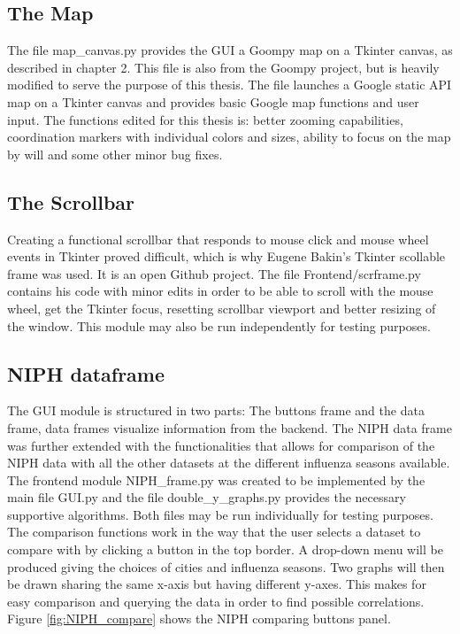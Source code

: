 \subsection{The Map}
The file map\_canvas.py provides the GUI a Goompy\cite{goompy} map on a Tkinter canvas, as described in chapter 2. This file is also from the Goompy project, but is heavily modified to serve the purpose of this thesis. The file launches a Google static API map on a Tkinter canvas and provides basic Google map functions and user input. The functions edited for this thesis is: better zooming capabilities, coordination markers with individual colors and sizes, ability to focus on the map by will and some other minor bug fixes.






\subsection{The Scrollbar}
Creating a functional scrollbar that responds to mouse click and mouse wheel events in Tkinter proved difficult, which is why Eugene Bakin's Tkinter scollable\cite{scrframe} frame was used. It is an open Github project. The file Frontend/scrframe.py contains his code with minor edits in order to be able to scroll with the mouse wheel, get the Tkinter focus, resetting scrollbar viewport and better resizing of the window. This module may also be run independently for testing purposes.




\subsection{NIPH dataframe}
The GUI module is structured in two parts: The buttons frame and the data frame, data frames visualize information from the backend. The NIPH data frame was further extended with the functionalities that allows for comparison of the NIPH data with all the other datasets at the different influenza seasons available. The frontend module NIPH\_frame.py was created to be implemented by the main file GUI.py and the file double\_y\_graphs.py provides the necessary supportive algorithms. Both files may be run individually for testing purposes. The comparison functions work in the way that the user selects a dataset to compare with by clicking a button in the top border. A drop-down menu will be produced giving the choices of cities and influenza seasons. Two graphs will then be drawn sharing the same x-axis but having different y-axes. This makes for easy comparison and querying the data in order to find possible correlations. Figure \ref{fig:NIPH_compare} shows the NIPH comparing buttons panel.

